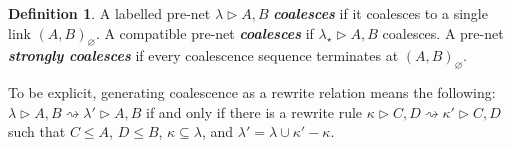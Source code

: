 \documentclass{article}
\theoremstyle{definition}
\newtheorem{definition}{Definition}
\theoremstyle{plain}
\newcommand\defn[1]{\textit{\textbf{#1}}}
\newcommand\+{+}
\renewcommand\*{\times}
\newcommand\fv{\textsc{fv}}
\newcommand\net[3]{#1\triangleright #2,#3}
\newcommand\join\bowtie
\newcommand\comp\frown
\newcommand\clink[3][\sigma]{(#2,#3)_{#1}}
\newcommand\minus{\mathop{/\mathchoice{\kern-3pt}{\kern-3pt}{\kern-2.5pt}{\kern-2pt}/}}
\newcommand\coals{\rightsquigarrow}
\newcommand\coal{\coals}%
\begin{document}
\begin{definition}
%
%
%
A labelled pre-net $\net\lambda AB$ \defn{coalesces} if it coalesces to a single link $\clink[\varnothing]AB$. A compatible pre-net \defn{coalesces} if $\net{\lambda_\star}AB$ coalesces. A pre-net \defn{strongly coalesces} if every coalescence sequence terminates at $\clink[\varnothing]AB$.
\end{definition}

To be explicit, generating coalescence as a rewrite relation means the following: $\net\lambda AB\coal \net{\lambda'}AB$ if and only if there is a rewrite rule $\net\kappa CD\coal\net{\kappa'} CD$ such that $C\leq A$, $D\leq B$, $\kappa\subseteq\lambda$, and $\lambda'=\lambda\cup\kappa'-\kappa$.
\end{document}
